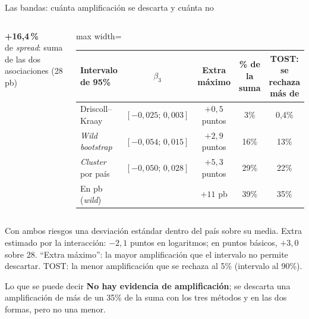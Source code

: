 \documentclass[aspectratio=169]{beamer}
\newcommand{\cifra}[2]{\begin{center}{\Huge\bfseries\color{tesisblue}#1}\\[2pt]{\small #2}\end{center}}
\begin{document}
\begin{frame}{Las bandas: cuánta amplificación se descarta y cuánta no}
\begin{columns}[c]
\cifra{+16,4\,\%}{de \textit{spread}: suma de las dos asociaciones (28 pb)}
\centering
\small
\begin{adjustbox}{max width=\textwidth}
\begin{tabular}{l cccc}
\toprule
Intervalo de 95\% & $\beta_3$ & Extra máximo & \% de la suma & TOST: se rechaza más de \\
\midrule
Driscoll--Kraay & $[-0{,}025;\,0{,}003]$ & $+0{,}5$ puntos & 3\% & 0,4\% \\
\textit{Wild bootstrap} & $[-0{,}054;\,0{,}015]$ & $+2{,}9$ puntos & 16\% & 13\% \\
\textit{Cluster} por país & $[-0{,}050;\,0{,}028]$ & $+5{,}3$ puntos & 29\% & 22\% \\
En pb (\textit{wild}) & & $+11$ pb & 39\% & 35\% \\
\bottomrule
\end{tabular}
\end{adjustbox}
\end{columns}
\vspace{2pt}
{\footnotesize\raggedright Con ambos riesgos una desviación estándar dentro del país sobre su media. Extra estimado por la interacción: $-2{,}1$ puntos en logaritmos; en puntos básicos, $+3{,}0$ sobre 28. ``Extra máximo'': la mayor amplificación que el intervalo no permite descartar. TOST: la menor amplificación que se rechaza al 5\% (intervalo al 90\%).\par}
\vspace{-2pt}
\begin{alertblock}{Lo que se puede decir}
\footnotesize \textbf{No hay evidencia de amplificación}; se descarta una amplificación de más de un 35\% de la suma con los tres métodos y en las dos formas, pero no una menor.
\end{alertblock}
\end{frame}
\end{document}
